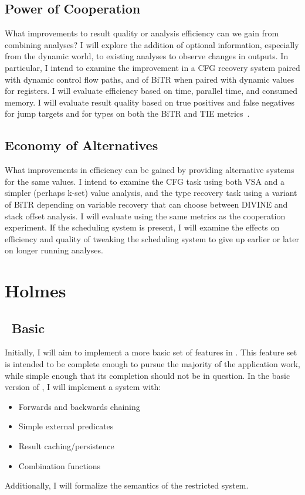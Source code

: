 \subsection{Power of Cooperation}
What improvements to result quality or analysis efficiency can we gain from combining analyses?
I will explore the addition of optional information, especially from the dynamic world, to existing analyses to observe changes in outputs.
In particular, I intend to examine the improvement in a CFG recovery system paired with dynamic control flow paths, and of BiTR when paired with dynamic values for registers.
I will evaluate efficiency based on time, parallel time, and consumed memory.
I will evaluate result quality based on true positives and false negatives for jump targets and for types on both the BiTR and TIE metrics~\cite{bitr, tie}.
\subsection{Economy of Alternatives}
What improvements in efficiency can be gained by providing alternative systems for the same values.
I intend to examine the CFG task using both VSA and a simpler (perhaps k-set) value analysis, and the type recovery task using a variant of BiTR depending on variable recovery that can choose between DIVINE and stack offset analysis.
I will evaluate using the same metrics as the cooperation experiment.
If the scheduling system is present, I will examine the effects on efficiency and quality of tweaking the scheduling system to give up earlier or later on longer running analyses.

\section{Holmes}
\subsection{\sysname\ Basic}
\label{sec:holmesBasic}
Initially, I will aim to implement a more basic set of features in \sysname.
This feature set is intended to be complete enough to pursue the majority of the application work, while simple enough that its completion should not be in question.
In the basic version of \sysname, I will implement a system with:
\begin{itemize}
\item Forwards and backwards chaining
\item Simple external predicates
\item Result caching/persistence
\item Combination functions
\end{itemize}
Additionally, I will formalize the semantics of the restricted system.

